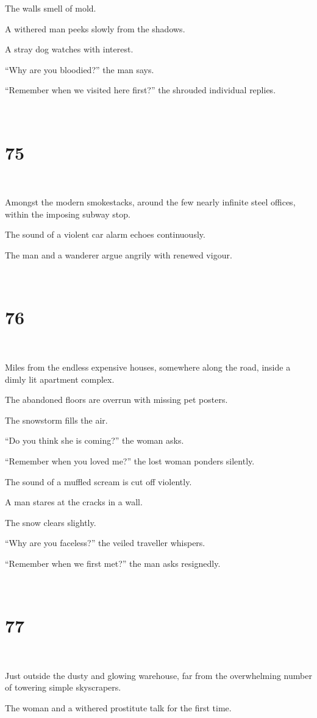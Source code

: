 \documentclass{report}
\begin{document}
The walls smell of mold.

A withered man peeks slowly from the shadows.

A stray dog watches with interest.

``Why are you bloodied?'' the man says.

``Remember when we visited here first?'' the shrouded individual replies.

~
\chapter*{75}
~

Amongst the modern smokestacks, around the few nearly infinite steel offices, within the imposing subway stop.

The sound of a violent car alarm echoes continuously.

The man and a wanderer argue angrily with renewed vigour.

~
\chapter*{76}
~

Miles from the endless expensive houses, somewhere along the road, inside a dimly lit apartment complex.

The abandoned floors are overrun with missing pet posters.

The snowstorm fills the air.

``Do you think she is coming?'' the woman asks.

``Remember when you loved me?'' the lost woman ponders silently.

The sound of a muffled scream is cut off violently.

A man stares at the cracks in a wall.

The snow clears slightly.

``Why are you faceless?'' the veiled traveller whispers.

``Remember when we first met?'' the man asks resignedly.

~
\chapter*{77}
~

Just outside the dusty and glowing warehouse, far from the overwhelming number of towering simple skyscrapers.

The woman and a withered prostitute talk for the first time.
\end{document}
